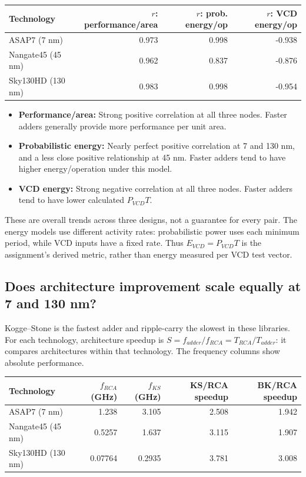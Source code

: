 \documentclass[10pt,letterpaper]{article}
\begin{document}
\begin{center}\small
\begin{tabular}{lrrr}
\toprule
Technology & $r$: performance/area & $r$: prob. energy/op & $r$: VCD energy/op \\
\midrule
ASAP7 (7 nm) & 0.973 & 0.998 & -0.938 \\
Nangate45 (45 nm) & 0.962 & 0.837 & -0.876 \\
Sky130HD (130 nm) & 0.983 & 0.998 & -0.954 \\
\bottomrule
\end{tabular}
\end{center}

\begin{itemize}
\item \textbf{Performance/area:} Strong positive correlation at all three
nodes. Faster adders generally provide more performance per unit area.
\item \textbf{Probabilistic energy:} Nearly perfect positive correlation
at 7 and 130 nm, and a less close positive relationship at 45 nm. Faster
adders tend to have higher energy/operation under this model.
\item \textbf{VCD energy:} Strong negative correlation at all three nodes.
Faster adders tend to have lower calculated $P_{VCD}T$.
\end{itemize}
These are overall trends across three designs, not a guarantee for every
pair. The energy models use different activity rates: probabilistic power
uses each minimum period, while VCD inputs have a fixed rate. Thus
$E_{VCD}=P_{VCD}T$ is the assignment's derived metric, rather than energy
measured per VCD test vector.

\subsection{Does architecture improvement scale equally at 7 and 130 nm?}
Kogge--Stone is the fastest adder and ripple-carry the slowest in these
libraries. For each technology, architecture speedup is
$S=f_{adder}/f_{RCA}=T_{RCA}/T_{adder}$: it compares architectures within
that technology. The frequency columns show absolute performance.


\begin{center}\small
\begin{tabular}{lrrrr}
\toprule
Technology & $f_{RCA}$ (GHz) & $f_{KS}$ (GHz) & KS/RCA speedup & BK/RCA speedup \\
\midrule
ASAP7 (7 nm) & 1.238 & 3.105 & 2.508 & 1.942 \\
Nangate45 (45 nm) & 0.5257 & 1.637 & 3.115 & 1.907 \\
Sky130HD (130 nm) & 0.07764 & 0.2935 & 3.781 & 3.008 \\
\bottomrule
\end{tabular}
\end{center}
\end{document}
